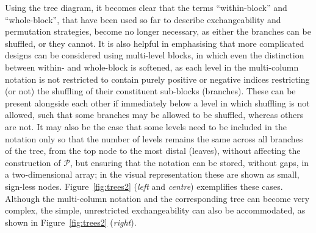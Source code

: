 Using the tree diagram, it becomes clear that the terms ``within-block'' and ``whole-block'', that have been used so far to describe exchangeability and permutation strategies, become no longer necessary, as either the branches can be shuffled, or they cannot. It is also helpful in emphasising that more complicated designs can be considered using multi-level blocks, in which even the distinction between within- and  whole-block is softened, as each level in the multi-column notation is not restricted to contain purely positive or negative indices restricting (or not) the shuffling of their constituent sub-blocks (branches). These can be present alongside each other if immediately below a level in which shuffling is not allowed, such that some branches may be allowed to be shuffled, whereas others are not. It may also be the case that some levels need to be included in the notation only so that the number of levels remains the same across all branches of the tree, from the top node to the most distal (leaves), without affecting the construction of $\mathcal{P}$, but ensuring that the notation can be stored, without gaps, in a two-dimensional array; in the visual representation these are shown as small, sign-less nodes. Figure~\ref{fig:trees2} (\emph{left} and \emph{centre}) exemplifies these cases. Although the multi-column notation and the corresponding tree can become very complex, the simple, unrestricted exchangeability can also be accommodated, as shown in Figure~\ref{fig:trees2} (\emph{right}).

